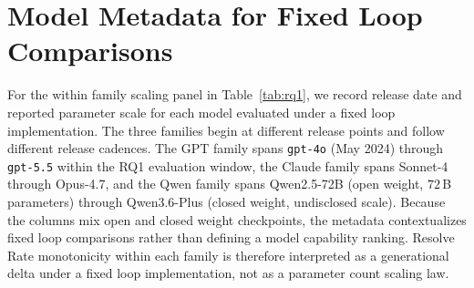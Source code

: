 \section{Model Metadata for Fixed Loop Comparisons}\label{app:model-release}

For the within family scaling panel in Table~\ref{tab:rq1}, we record release date and reported parameter scale for each model evaluated under a fixed loop implementation. The three families begin at different release points and follow different release cadences. The GPT family spans \texttt{gpt-4o} (May 2024) through \texttt{gpt-5.5} within the RQ1 evaluation window, the Claude family spans Sonnet-4 through Opus-4.7, and the Qwen family spans Qwen2.5-72B (open weight, $72$\,B parameters) through Qwen3.6-Plus (closed weight, undisclosed scale). Because the columns mix open and closed weight checkpoints, the metadata contextualizes fixed loop comparisons rather than defining a model capability ranking. Resolve Rate monotonicity within each family is therefore interpreted as a generational delta under a fixed loop implementation, not as a parameter count scaling law.

